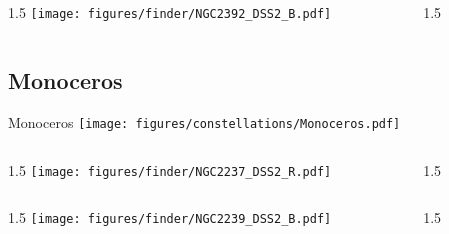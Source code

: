 \documentclass[final]{beamer}
\newlength{\colwidth}
\begin{document}

\begin{frame}[t]{}
  \begin{columns}[T]
    \begin{column}{1.5\colwidth}
      \centering
      \texttt{[image: figures/finder/NGC2392\_DSS2\_B.pdf]}
    \end{column}
    \begin{column}{1.5\colwidth}
      \Large
      
    \end{column}
  \end{columns}
  \vspace{\fill}
\end{frame}

\subsection{Monoceros}

\begin{frame}[t]{\LARGE Monoceros}
  \centering
  \texttt{[image: figures/constellations/Monoceros.pdf]}
\end{frame}


\begin{frame}[t]{}
  \begin{columns}[T]
    \begin{column}{1.5\colwidth}
      \centering
      \texttt{[image: figures/finder/NGC2237\_DSS2\_R.pdf]}
    \end{column}
    \begin{column}{1.5\colwidth}
      \Large
      
    \end{column}
  \end{columns}
  \vspace{\fill}
  \begin{columns}[T]
    \begin{column}{1.5\colwidth}
      \centering
      \texttt{[image: figures/finder/NGC2239\_DSS2\_B.pdf]}
    \end{column}
    \begin{column}{1.5\colwidth}
      \Large
      
    \end{column}
  \end{columns}
\end{frame}
\end{document}
